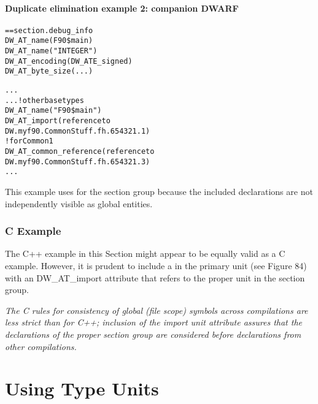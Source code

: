 \paragraph{Duplicate elimination example 2: companion DWARF }
\label{app:duplicateeliminationexample2companiondwarf}

\begin{alltt}
== section .debug\_info
        DW\-\_AT\-\_name(F90\$main)
            DW\-\_AT\-\_name("INTEGER")
            DW\-\_AT\-\_encoding(DW\-\_ATE\-\_signed)
            DW\-\_AT\-\_byte\-\_size(...)

            ...
        ...  ! other base types
            DW\-\_AT\-\_name("F90\$main")
                DW\-\_AT\-\_import(reference to
                    DW.myf90.CommonStuff.fh.654321.1)
             ! for Common1
                DW\-\_AT\-\_common\-\_reference(reference to
                    DW.myf90.CommonStuff.fh.654321.3)
            ...
\end{alltt}


This example uses  for the section group
because the included declarations are not independently
visible as global entities.


\subsubsection{C Example}

The C++ example in this Section might appear to be equally
valid as a C example. However, it is prudent to include
a  in the primary unit (see Figure 84)
with an DW\-\_AT\-\_import attribute that refers to the proper unit
in the section group.

\textit{The C rules for consistency of global (file scope) symbols
across compilations are less strict than for C++; inclusion
of the import unit attribute assures that the declarations of
the proper section group are considered before declarations
from other compilations.}


\section{Using Type Units}
\label{app:usingtypeunits}

